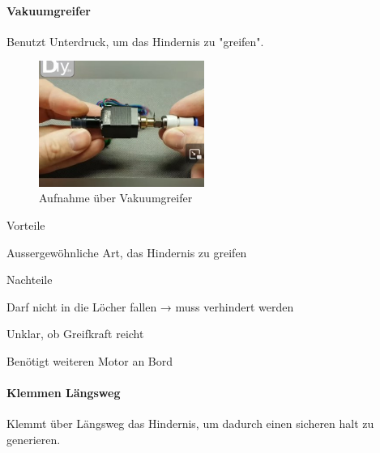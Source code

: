 \documentclass[../main.tex]{subfiles}
\begin{document}
\paragraph{Vakuumgreifer}
Benutzt Unterdruck, um das Hindernis zu "greifen".

\begin{figure}[h!]
        \centering
        \includegraphics[width=0.48\textwidth]{img/technologierecherche/Aufnahme/Vakuumgreifer.jpg}
        \caption[Aufnahme über Vakuumgreifer]{Aufnahme über Vakuumgreifer \footnotemark}
        \label{img:tech_Vakuumgreifer}
\end{figure}

\begin{minipage}[t]{0.48\textwidth}
    \begin{items}
          \item [Vorteile]
          \item Aussergewöhnliche Art, das Hindernis zu greifen
    \end{items}
\end{minipage}
\hfill
\begin{minipage}[t]{0.48\textwidth}
    \begin{items}
          \item [Nachteile]
          \item Darf nicht in die Löcher fallen → muss verhindert werden
          \item Unklar, ob Greifkraft reicht
          \item Benötigt weiteren Motor an Bord
    \end{items}
\end{minipage}
\newpage
\paragraph{Klemmen Längsweg}
Klemmt über Längsweg das Hindernis, um dadurch einen sicheren halt zu generieren.
\end{document}
